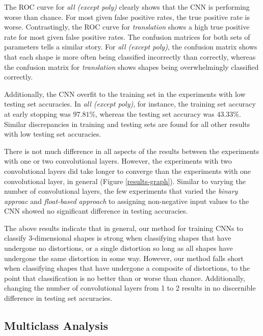 \documentclass{article}
\begin{document}
The ROC curve for \textit{all (except poly)} clearly shows that the CNN is performing worse than chance. For most given false positive rates, the true positive rate is worse. Contrastingly, the ROC curve for \textit{translation} shows a high true positive rate for most given false positive rates. The confusion matrices for both sets of parameters tells a similar story. For \textit{all (except poly)}, the confusion matrix shows that each shape is more often being classified incorrectly than correctly, whereas the confusion matrix for \textit{translation} shows shapes being overwhelmingly classified correctly.

Additionally, the CNN overfit to the training set in the experiments with low testing set accuracies. In \textit{all (except poly)}, for instance, the training set accuracy at early stopping was $97.81\%$, whereas the testing set accuracy was $43.33\%$. Similar discrepancies in training and testing sets are found for all other results with low testing set accuracies.

There is not much difference in all aspects of the results between the experiments with one or two convolutional layers. However, the experiments with two convolutional layers did take longer to converge than the experiments with one convolutional layer, in general (Figure \ref{results-graph}). Similar to varying the number of convolutional layers, the few experiments that varied the \textit{binary approac} and \textit{float-based approach} to assigning non-negative input values to the CNN showed no significant difference in testing accuracies.

The above results indicate that in general, our method for training CNNs to classify 3-dimensional shapes is strong when classifying shapes that have undergone no distortions, or a single distortion so long as all shapes have undergone the same distortion in some way. However, our method falls short when classifying shapes that have undergone a composite of distortions, to the point that classification is no better than or worse than chance. Additionally, changing the number of convolutional layers from 1 to 2 results in no discernible difference in testing set accuracies.

\subsection{Multiclass Analysis}
\end{document}
